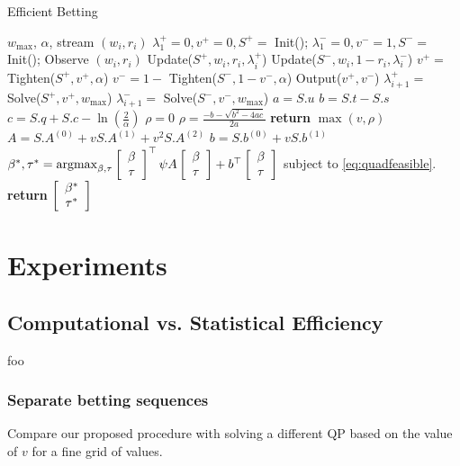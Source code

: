 \begin{algorithm}[tb]
   \caption{Efficient Betting}
   \label{alg:main}
\begin{algorithmic}
     $w_{\max}$, $\alpha$, stream $(w_i,r_i)$
    \STATE $\lambda_1^+ = 0, v^+ = 0, S^+ = $ Init();
    \STATE $\lambda_1^- = 0, v^- = 1, S^- = $ Init();
        \STATE Observe $(w_i,r_i)$
        \STATE Update($S^+,w_i,r_i,\lambda_i^+$)
        \STATE Update($S^-,w_i,1-r_i,\lambda_i^-$)
        \STATE $v^{+} = $ Tighten($S^+,v^+,{\alpha}$)
        \STATE $v^{-} = 1-$ Tighten($S^-,1-v^-,{\alpha}$)
        \STATE Output($v^{+},v^-$)
        \STATE $\lambda_{i+1}^{+} =$ Solve($S^+,v^+, w_{\max}$)
        \STATE $\lambda_{i+1}^{-} =$ Solve($S^-,v^-, w_{\max}$)
   \ENDFOR
{}
\ENDFUNCTION
{}
{
    \STATE $a=S.u$
    \STATE $b=S.t-S.s$
    \STATE $c=S.q + S.c - \ln\left(\frac{2}{\alpha}\right)$ 
    \STATE $\rho=0$
    \ELSE 
    \STATE $\rho=\frac{-b-\sqrt{b^2-4ac}}{2a}$
    \ENDIF
    \STATE \textbf{return} $\max(v,\rho)$
}
\ENDFUNCTION
{}
{
    \STATE $A = S.A^{(0)} +v S.A^{(1)} + v^2 S.A^{(2)}$
    \STATE $b = S.b^{(0)} +v S.b^{(1)}$
    \STATE $\beta^*,\tau^* =\operatorname{argmax}_{\beta, \tau} 
    \left[\begin{array}{c} \beta \\ \tau \end{array}\right]^\top \psi A\left[\begin{array}{c} \beta \\ \tau \end{array}\right] + 
    b^\top \left[\begin{array}{c} \beta \\ \tau \end{array}\right]$ subject to \eqref{eq:quadfeasible}.
    \STATE \textbf{return} $\left[\begin{array}{c} \beta^* \\ \tau^* \end{array}\right]$
}
\ENDFUNCTION
\end{algorithmic}
\end{algorithm}

\section{Experiments}

\subsection{Computational vs. Statistical Efficiency}
foo
\subsubsection{Separate betting sequences}
Compare our proposed procedure with solving a different QP based on 
the value of $v$ for a fine grid of values.

